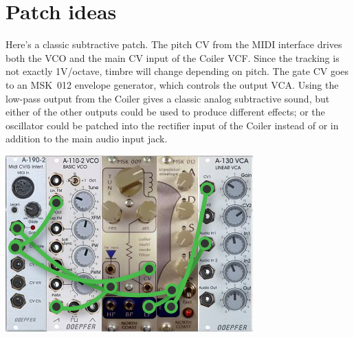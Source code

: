 
%
%
%
%
%
%

\chapter{Patch ideas}

Here's a classic subtractive patch.  The pitch CV from the MIDI interface
drives both the VCO and the main CV input of the Coiler VCF.  Since the
tracking is not exactly 1V/octave, timbre will change depending on pitch. 
The gate CV goes to an MSK~012 envelope generator, which controls the output
VCA.  Using the low-pass output from the Coiler gives a classic analog
subtractive sound, but either of the other outputs could be used to produce
different effects; or the oscillator could be patched into the rectifier
input of the Coiler instead of or in addition to the main audio input jack.

\nopagebreak\noindent
{\hspace*{\fill}\includegraphics[scale=1.8]{patch1.png}\hspace*{\fill}\par} 

